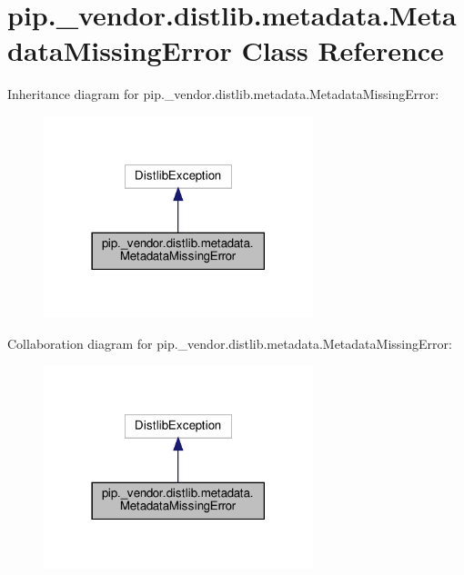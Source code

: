 \hypertarget{classpip_1_1__vendor_1_1distlib_1_1metadata_1_1MetadataMissingError}{}\section{pip.\+\_\+vendor.\+distlib.\+metadata.\+Metadata\+Missing\+Error Class Reference}
\label{classpip_1_1__vendor_1_1distlib_1_1metadata_1_1MetadataMissingError}


Inheritance diagram for pip.\+\_\+vendor.\+distlib.\+metadata.\+Metadata\+Missing\+Error\+:
\nopagebreak
\begin{figure}[H]
\begin{center}
\leavevmode
\includegraphics[width=222pt]{classpip_1_1__vendor_1_1distlib_1_1metadata_1_1MetadataMissingError__inherit__graph}
\end{center}
\end{figure}


Collaboration diagram for pip.\+\_\+vendor.\+distlib.\+metadata.\+Metadata\+Missing\+Error\+:
\nopagebreak
\begin{figure}[H]
\begin{center}
\leavevmode
\includegraphics[width=222pt]{classpip_1_1__vendor_1_1distlib_1_1metadata_1_1MetadataMissingError__coll__graph}
\end{center}
\end{figure}


